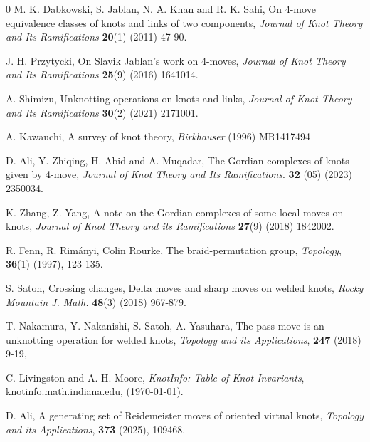 \documentclass[12pt]{amsart}
\theoremstyle{remark}
\begin{document}
\begin{thebibliography}{0}
M. K. Dabkowski, S. Jablan, N. A. Khan and R. K. Sahi, On 4-move equivalence classes of knots and links of two components, {\it Journal of Knot Theory and Its Ramifications} \textbf{20}(1) (2011) 47-90.

J. H. Przytycki, On Slavik Jablan’s work on 4-moves, {\it Journal of Knot Theory and Its Ramifications} \textbf{25}(9) (2016) 1641014.

A. Shimizu, Unknotting operations on knots and links, {\it Journal of Knot Theory and Its Ramifications} \textbf{30}(2) (2021) 2171001.

A. Kawauchi, A survey of knot theory, {\it Birkhauser} (1996) MR1417494

 D. Ali, Y. Zhiqing, H. Abid and A. Muqadar, The Gordian complexes of knots given by 4-move, {\it Journal of Knot Theory and Its Ramifications}. {\bf 32} (05) (2023) 2350034.

K. Zhang, Z. Yang, A note on the Gordian complexes of some local moves on knots, {\it Journal of Knot Theory  and its Ramifications} \textbf{27}(9) (2018) 1842002.

R. Fenn, R. Rimányi, Colin Rourke, The braid-permutation group, {\it Topology},
\textbf{36}(1) (1997), 123-135.

S. Satoh, Crossing changes, Delta moves and sharp moves on welded knots, {\it Rocky Mountain J. Math.} \textbf{48}(3) (2018) 967-879.

T. Nakamura, Y. Nakanishi, S. Satoh, A. Yasuhara, The pass move is an unknotting operation for welded knots, {\it Topology and its Applications}, \textbf{247} (2018) 9-19,

 C. Livingston and A. H. Moore, \textit{KnotInfo: Table of Knot Invariants}, knotinfo.math.indiana.edu, (\today).

D. Ali, A generating set of Reidemeister moves of oriented virtual knots, {\it Topology and its Applications}, \textbf{373} (2025), 109468.

\end{thebibliography}
\end{document}

